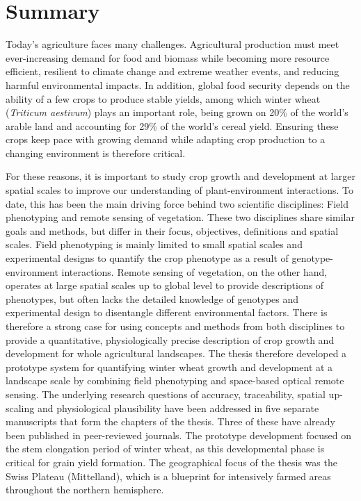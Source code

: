 \chapter*{Summary}

Today's agriculture faces many challenges. Agricultural production must meet ever-increasing demand for food and biomass while becoming more resource efficient, resilient to climate change and extreme weather events, and reducing harmful environmental impacts. In addition, global food security depends on the ability of a few crops to produce stable yields, among which winter wheat (\textsl{Triticum aestivum}) plays an important role, being grown on 20\% of the world's arable land and accounting for 29\% of the world's cereal yield. Ensuring these crops keep pace with growing demand while adapting crop production to a changing environment is therefore critical.

For these reasons, it is important to study crop growth and development at larger spatial scales to improve our understanding of plant-environment interactions. To date, this has been the main driving force behind two scientific disciplines: Field phenotyping and remote sensing of vegetation. These two disciplines share similar goals and methods, but differ in their focus, objectives, definitions and spatial scales. Field phenotyping is mainly limited to small spatial scales and experimental designs to quantify the crop phenotype as a result of genotype-environment interactions. Remote sensing of vegetation, on the other hand, operates at large spatial scales up to global level to provide descriptions of phenotypes, but often lacks the detailed knowledge of genotypes and experimental design to disentangle different environmental factors. There is therefore a strong case for using concepts and methods from both disciplines to provide a quantitative, physiologically precise description of crop growth and development for whole agricultural landscapes.
The thesis therefore developed a prototype system for quantifying winter wheat growth and development at a landscape scale by combining field phenotyping and space-based optical remote sensing. The underlying research questions of accuracy, traceability, spatial up-scaling and physiological plausibility have been addressed in five separate manuscripts that form the chapters of the thesis. Three of these have already been published in peer-reviewed journals. The prototype development focused on the stem elongation period of winter wheat, as this developmental phase is critical for grain yield formation. The geographical focus of the thesis was the Swiss Plateau (Mittelland), which is a blueprint for intensively farmed areas throughout the northern hemisphere.

